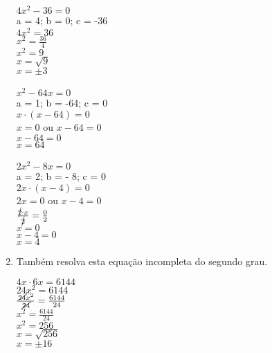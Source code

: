 \documentclass[a4paper,14pt]{article}
\begin{document}
\begin{multicols}{2}
\begin{enumerate}
        $4x^2 - 36 = 0$  \\ 
        a = 4; b = 0; c = -36 \\
        $4x^2 = 36$ \\
        $x^2 = \frac{36}{4}$ \\
        $x^2 = 9$ \\
        $x = \sqrt{9} $ \\
        $x = \pm{3} $ \\ \\
        
        $x^2 - 64x = 0$  \\ 
        a = 1; b = -64; c = 0 \\
        $x \cdot (x - 64) = 0$ \\
        $x = 0$ ou $x-64 = 0$ \\
        $x - 64 = 0$ \\
        $x = 64$ \\ \\
        
        $2x^2 - 8x = 0$   \\ 
        a = 2; b = - 8; c = 0 \\
        $2x \cdot (x - 4) = 0$ \\ 
        $2x = 0$ ou $x - 4 = 0$ \\
        $\frac{\cancel{2} \cdot x}{\cancel{2}} = \frac{0}{2}$ \\
        $x = 0$ \\
        $x - 4 = 0$ \\
        $x = 4$ \\
        
        \item Também resolva esta equação incompleta do segundo grau.
        
        $4x \cdot 6x = 6144$ \\
        $24x^2 = 6144$ \\
        $\frac{\cancel{24}x^2}{\cancel{24}} = \frac{6144}{24}$ \\
        $x^2 = \frac{6144}{24}$ \\
        $x^2 = 256$ \\
        $x = \sqrt{256}$ \\
        $x = \pm{16}$
        
        \newpage
        

\end{enumerate}
\end{multicols}
\end{document}
